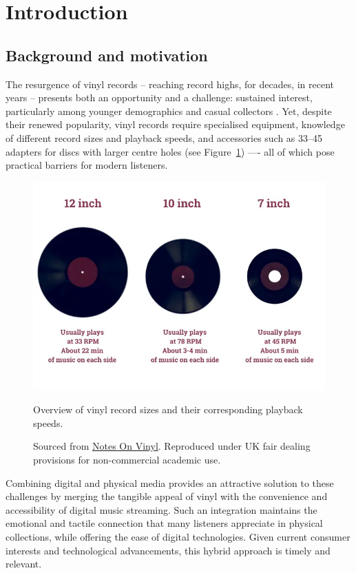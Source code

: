     \section{Introduction}
    
        \subsection{Background and motivation}
    
            The resurgence of vinyl records -- reaching record highs, for decades, in recent years \cite{geraghty2023uk_vinyl_sales} -- presents both an opportunity and a challenge: sustained interest, particularly among younger demographics and casual collectors \cite{Trapp2023}. Yet, despite their renewed popularity, vinyl records require specialised equipment, knowledge of different record sizes and playback speeds, and accessories such as 33–45 adapters for discs with larger centre holes (see Figure~\ref{fig:vinylSizes}) —- all of which pose practical barriers for modern listeners.
    
            \begin{figure}[htbp]
                \centering
                \includegraphics[width=0.8\linewidth]{images/33vs45.jpg}
                \caption{Overview of vinyl record sizes and their corresponding playback speeds.}
                \caption*{Sourced from \href{https://notesonvinyl.com/the-difference-between-33-vs-45-vinyl/}{Notes On Vinyl}. Reproduced under UK fair dealing provisions for non-commercial academic use.}
                \label{fig:vinylSizes}
            \end{figure}
    
            Combining digital and physical media provides an attractive solution to these challenges by merging the tangible appeal of vinyl with the convenience and accessibility of digital music streaming. Such an integration maintains the emotional and tactile connection that many listeners appreciate in physical collections, while offering the ease of digital technologies. Given current consumer interests and technological advancements, this hybrid approach is timely and relevant.
        
